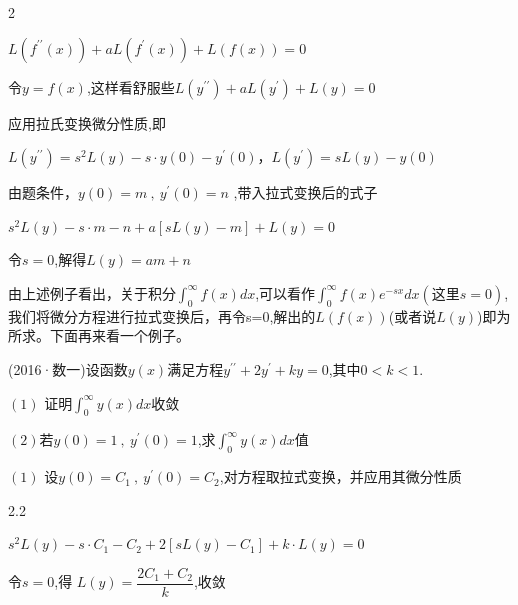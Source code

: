 \documentclass[12pt]{report}
\begin{document}
   \begin{spacing}{2}
   	\begin{center}
   		$L\left(f^{\prime\prime}\left(x\right)\right)+aL\left(f^{\prime}\left(x\right)\right)+L\left(f\left(x\right)\right)=0$
   		
   		令$y=f(x)$,这样看舒服些\hspace{1em}$L\left(y^{\prime\prime}\right)+aL\left(y^{\prime}\right)+L\left(y\right)=0$
   		
   		应用拉氏变换微分性质,即
   		
   		$L\left(y^{\prime\prime}\right)=s^{2}L\left(y\right)-s\cdot y\left(0\right)-y^{\prime}\left(0\right)$，$L\left(y^{\prime}\right)=sL\left(y\right)-y\left(0\right)$
   		
   		由题条件，$y\left(0\right)=m\:,\:y^{\prime}\left(0\right)=n$ ,带入拉式变换后的式子
   		
   		$s^{2}L\left(y\right)-s\cdot m-n+a\left\lbrack sL\left(y\right)-m\right\rbrack+L\left(y\right)=0$
   		
   		令$s=0$,解得$L(y)=am+n$
   	\end{center}
   \end{spacing}
   
   
   
  由上述例子看出，关于积分$\int_{0}^{\infty}f\left(x\right)dx$,可以看作$\int_{0}^{\infty}f\left(x\right)e^{-sx}dx (这里s=0)$,我们将微分方程进行拉式变换后，再令s=0,解出的$L(f(x))$(或者说$L(y)$)即为所求。下面再来看一个例子。
  
  \vspace{10pt}
  
   (2016·数一)设函数$y(x)$满足方程$y^{\prime\prime}+2y^{\prime}+ky=0$,其中$0<k<1$.
  
  $(1)$ 证明$\int_{0}^{\infty}y\left(x\right)dx$收敛
  
  $(2)$若$y\left(0\right)=1\:,\:y^{\prime}\left(0\right)=1$,求$\int_{0}^{\infty}y\left(x\right)dx$值
  
  \vspace{10pt}
  
   $(1)$ 设$y\left(0\right)=C_{1}\:,\:y^{\prime}\left(0\right)=C_{2}$,对方程取拉式变换，并应用其微分性质
  
  \vspace{-10pt}
  
  \begin{spacing}{2.2}
  	\begin{center}
  		$s^{2}L\left(y\right)-s\cdot C_{1}-C_{2}+2\left\lbrack sL\left(y\right)-C_{1}\right\rbrack+k\cdot L\left(y\right)=0$
  		
  		令$s=0$,得 $L\left(y\right)=\dfrac{2C_{1}+C_{2}}{k}$,收敛
  	\end{center}
  \end{spacing}
  
\end{document}
